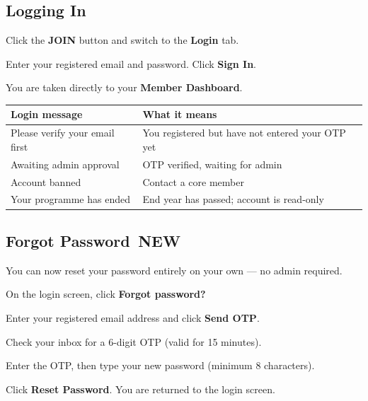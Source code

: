 \documentclass[12pt,a4paper]{article}
\newcommand{\newbadge}{%
  \colorbox{NewFrame}{\color{white}\,\textbf{\footnotesize NEW}\,}%
}
\begin{document}
\subsection{Logging In}

\begin{steps}
\item Click the \textbf{JOIN} button and switch to the \textbf{Login} tab.
\item Enter your registered email and password. Click \textbf{Sign In}.
\item You are taken directly to your \textbf{Member Dashboard}.
\end{steps}

\begin{center}
\renewcommand{\arraystretch}{1.3}
\begin{tabularx}{\linewidth}{L{5.2cm} X}
\toprule
\textbf{Login message} & \textbf{What it means} \\
\midrule
Please verify your email first & You registered but have not entered your OTP yet \\
Awaiting admin approval & OTP verified, waiting for admin \\
Account banned & Contact a core member \\
Your programme has ended & End year has passed; account is read-only \\
\bottomrule
\end{tabularx}
\end{center}

\subsection{Forgot Password \newbadge}

You can now reset your password entirely on your own --- no admin required.

\begin{steps}
\item On the login screen, click \textbf{Forgot password?}
\item Enter your registered email address and click \textbf{Send OTP}.
\item Check your inbox for a 6-digit OTP (valid for 15 minutes).
\item Enter the OTP, then type your new password (minimum 8 characters).
\item Click \textbf{Reset Password}. You are returned to the login screen.
\end{steps}
\end{document}
